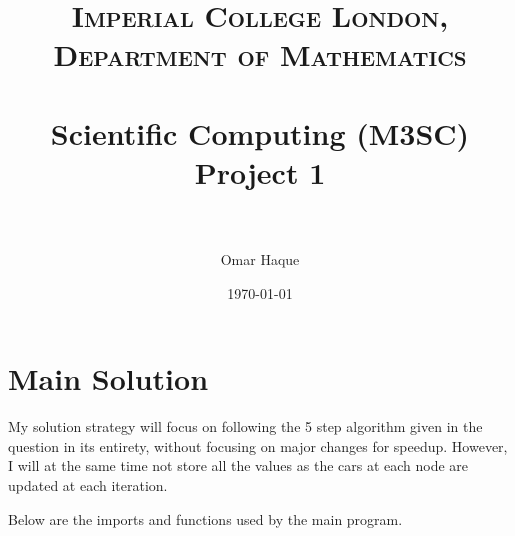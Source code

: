\documentclass[paper=a4, fontsize=12pt]{scrartcl} %
\title{
\normalfont \normalsize
\textsc{Imperial College London, Department of Mathematics} \\ [25pt]
\horrule{0.5pt} \\[0.4cm]                      %
\huge Scientific Computing (M3SC) Project 1 \\           %
\horrule{2pt} \\[0.5cm]                        %
}
\author{Omar Haque}
\date{\normalsize\today}
\numberwithin{equation}{section}       %
\numberwithin{figure}{section}         %
\numberwithin{table}{section}          %
\begin{document}

\maketitle

\section{Main Solution}

My solution strategy will focus on following the 5 step algorithm given in the question in its entirety, without focusing on major changes for speedup. However, I will at the same time not store all the values as the cars at each node are updated at each iteration. 

Below are the imports and functions used by the main program. 
\end{document}
